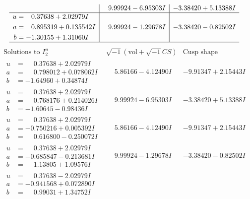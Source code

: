 \documentclass[1p]{elsarticle_modified}
\theoremstyle{definition}
\newcommand{\I}{\sqrt{-1}}
\begin{document}
$$\begin{array}{c|c|c}
 & \phantom{-}9.99924 - 6.95303 I & -3.38420 + 5.13388 I \\ \hline\begin{aligned}
u &= \phantom{-}0.37638 + 2.02979 I \\
a &= \phantom{-}0.895319 + 0.135542 I \\
b &= -1.30155 + 1.31060 I\end{aligned}
 & \phantom{-}9.99924 - 1.29678 I & -3.38420 - 0.82502 I\\
 \hline 
 \end{array}$$\newpage$$\begin{array}{c|c|c}  
\text{Solutions to }I^u_{2}& \I (\text{vol} + \sqrt{-1}CS) & \text{Cusp shape}\\
 \hline 
\begin{aligned}
u &= \phantom{-}0.37638 + 2.02979 I \\
a &= \phantom{-}0.798012 + 0.078062 I \\
b &= -1.64960 + 0.34874 I\end{aligned}
 & \phantom{-}5.86166 - 4.12490 I & -9.91347 + 2.15443 I \\ \hline\begin{aligned}
u &= \phantom{-}0.37638 + 2.02979 I \\
a &= \phantom{-}0.768176 + 0.214026 I \\
b &= -1.60645 - 0.98436 I\end{aligned}
 & \phantom{-}9.99924 - 6.95303 I & -3.38420 + 5.13388 I \\ \hline\begin{aligned}
u &= \phantom{-}0.37638 + 2.02979 I \\
a &= -0.750216 + 0.005392 I \\
b &= \phantom{-}0.616800 - 0.250072 I\end{aligned}
 & \phantom{-}5.86166 - 4.12490 I & -9.91347 + 2.15443 I \\ \hline\begin{aligned}
u &= \phantom{-}0.37638 + 2.02979 I \\
a &= -0.685847 - 0.213681 I \\
b &= \phantom{-}1.13805 + 1.09576 I\end{aligned}
 & \phantom{-}9.99924 - 1.29678 I & -3.38420 - 0.82502 I \\ \hline\begin{aligned}
u &= \phantom{-}0.37638 - 2.02979 I \\
a &= -0.941568 + 0.072890 I \\
b &= \phantom{-}0.99031 + 1.34752 I\end{aligned}

\end{array}$$
\end{document}
